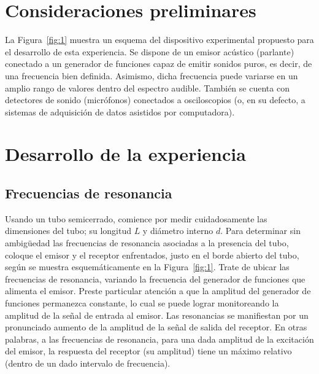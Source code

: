 \documentclass[laboratorio]{guia}
\begin{document}
 
\maketitle

\section{Consideraciones preliminares}

La Figura~\ref{fig:1} muestra un esquema del dispositivo experimental propuesto
para el desarrollo de esta experiencia. Se dispone de un emisor ac\'ustico
(parlante) conectado a un generador de funciones capaz de emitir sonidos puros,
es decir, de una frecuencia bien definida. Asimismo, dicha frecuencia puede
variarse en un amplio rango de valores dentro del espectro audible. Tambi\'en
se cuenta con detectores de sonido (micr\'ofonos) conectados a osciloscopios
(o, en su defecto, a sistemas de adquisici\'on de datos asistidos por
computadora). 

\section{Desarrollo de la experiencia}

\subsection{Frecuencias de resonancia}

Usando un tubo semicerrado, comience por medir cuidadosamente las dimensiones
del tubo; su longitud $L$ y di\'ametro interno $d$. Para determinar sin
ambig\"uedad las frecuencias de resonancia asociadas a la presencia del tubo,
coloque el emisor y el receptor enfrentados, justo en el borde abierto del
tubo, seg\'un se muestra esquem\'aticamente en la Figura~\ref{fig:1}. Trate de
ubicar las frecuencias de resonancia, variando la frecuencia del generador de
funciones que alimenta el emisor. Preste particular atenci\'on a que la
amplitud del generador de funciones permanezca constante, lo cual se puede
lograr monitoreando la amplitud de la se\~nal de entrada al emisor. Las
resonancias se manifiestan por un pronunciado aumento de la amplitud de la
se\~nal de salida del receptor. En otras palabras, a las frecuencias de
resonancia, para una dada amplitud de la excitaci\'on del emisor, la respuesta
del receptor (su amplitud) tiene un m\'aximo relativo (dentro de un dado
intervalo de frecuencia).
\end{document}
